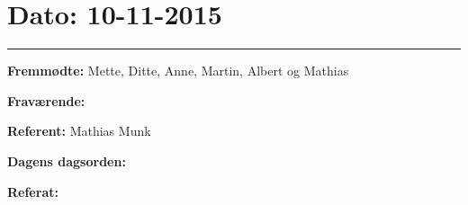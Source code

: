 \section{Dato: 10-11-2015}
\hrule

\textbf{Fremmødte:} Mette, Ditte, Anne, Martin, Albert og Mathias 

\textbf{Fraværende:}

\textbf{Referent:} Mathias Munk

\textbf{Dagens dagsorden:}

\textbf{Referat:}
\newline 